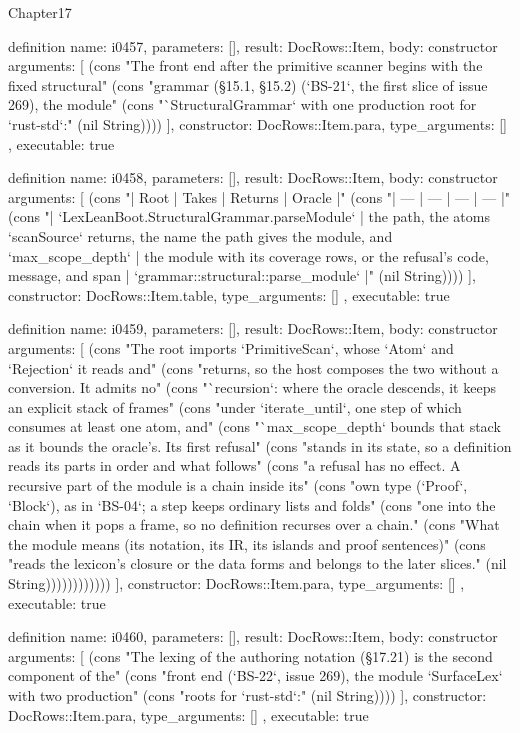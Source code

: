 \begin{lexlean}{Chapter17}
\begin{semanticmodule}
definition{
  name: i0457,
  parameters: [],
  result: DocRows::Item,
  body: constructor{
    arguments: [
      (cons "The front end after the primitive scanner begins with the fixed structural" (cons "grammar (§15.1, §15.2) (`BS-21`, the first slice of issue 269), the module" (cons "`StructuralGrammar` with one production root for `rust-std`:" (nil String))))
    ],
    constructor: DocRows::Item.para,
    type_arguments: []
  },
  executable: true
}

definition{
  name: i0458,
  parameters: [],
  result: DocRows::Item,
  body: constructor{
    arguments: [
      (cons "| Root | Takes | Returns | Oracle |" (cons "| --- | --- | --- | --- |" (cons "| `LexLeanBoot.StructuralGrammar.parseModule` | the path, the atoms `scanSource` returns, the name the path gives the module, and `max_scope_depth` | the module with its coverage rows, or the refusal's code, message, and span | `grammar::structural::parse_module` |" (nil String))))
    ],
    constructor: DocRows::Item.table,
    type_arguments: []
  },
  executable: true
}

definition{
  name: i0459,
  parameters: [],
  result: DocRows::Item,
  body: constructor{
    arguments: [
      (cons "The root imports `PrimitiveScan`, whose `Atom` and `Rejection` it reads and" (cons "returns, so the host composes the two without a conversion. It admits no" (cons "`recursion`: where the oracle descends, it keeps an explicit stack of frames" (cons "under `iterate_until`, one step of which consumes at least one atom, and" (cons "`max_scope_depth` bounds that stack as it bounds the oracle's. Its first refusal" (cons "stands in its state, so a definition reads its parts in order and what follows" (cons "a refusal has no effect. A recursive part of the module is a chain inside its" (cons "own type (`Proof`, `Block`), as in `BS-04`; a step keeps ordinary lists and folds" (cons "one into the chain when it pops a frame, so no definition recurses over a chain." (cons "What the module means (its notation, its IR, its islands and proof sentences)" (cons "reads the lexicon's closure or the data forms and belongs to the later slices." (nil String))))))))))))
    ],
    constructor: DocRows::Item.para,
    type_arguments: []
  },
  executable: true
}

definition{
  name: i0460,
  parameters: [],
  result: DocRows::Item,
  body: constructor{
    arguments: [
      (cons "The lexing of the authoring notation (§17.21) is the second component of the" (cons "front end (`BS-22`, issue 269), the module `SurfaceLex` with two production" (cons "roots for `rust-std`:" (nil String))))
    ],
    constructor: DocRows::Item.para,
    type_arguments: []
  },
  executable: true
}


\end{semanticmodule}
\end{lexlean}
